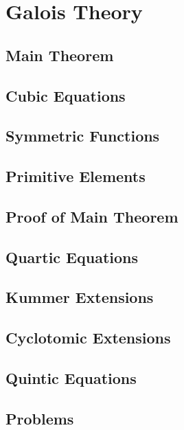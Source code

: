 \chapter{Galois Theory}
\section{Main Theorem}
\section{Cubic Equations}
\section{Symmetric Functions}
\section{Primitive Elements}
\section{Proof of Main Theorem}
\section{Quartic Equations}
\section{Kummer Extensions}
\section{Cyclotomic Extensions}
\section{Quintic Equations}
\section{Problems}